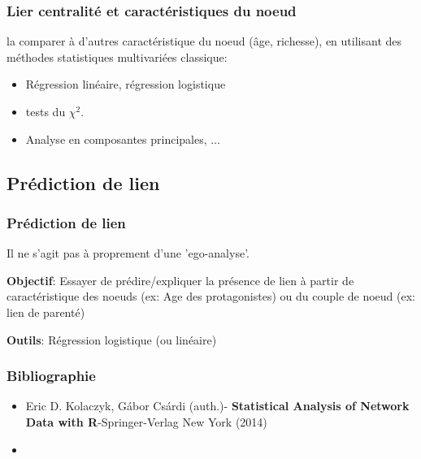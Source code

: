 \documentclass{beamer}
\begin{document}
\begin{frame}
 \frametitle{Lier centralité et caractéristiques du noeud}
 
 la comparer à d'autres caractéristique du noeud (âge, richesse), en utilisant des méthodes statistiques multivariées classique: 
 \begin{itemize}
  \item Régression linéaire, régression logistique 
  \item tests du $\chi^2$. 
  \item Analyse en composantes principales, ...
 \end{itemize}

 
 
\end{frame}






\subsection{Prédiction de lien}

\begin{frame}
\frametitle{Prédiction de lien}

Il ne s'agit pas à proprement d'une 'ego-analyse'. 

\bigskip

{\bf Objectif}: Essayer de prédire/expliquer la présence de lien à partir de caractéristique des noeuds (ex: Age des protagonistes)  ou du couple de noeud (ex: lien de parenté)


\medskip 


{\bf Outils}: Régression logistique (ou linéaire)





\end{frame}



\begin{frame}
\frametitle{Bibliographie}


\begin{itemize}
 \item Eric D. Kolaczyk, Gábor Csárdi (auth.)- {\bf Statistical Analysis of Network Data with R}-Springer-Verlag New York (2014)
 \item 
\end{itemize}



\end{frame}
\end{document}
